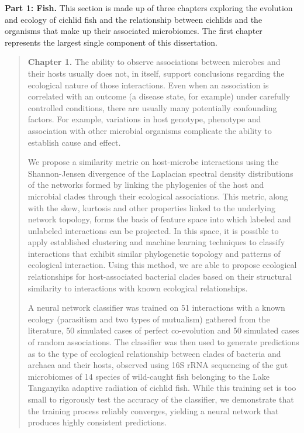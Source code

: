 
\noindent\textbf{Part 1: Fish.} 
This section is made up of three chapters exploring the evolution and ecology of cichlid fish and the relationship between cichlids and the organisms that make up their associated microbiomes. The first chapter represents the largest single component of this dissertation. 

\begin{quote}
\noindent\textbf{Chapter 1.} The ability to observe associations between microbes and their hosts usually does not, in itself, support conclusions regarding the ecological nature of those interactions. Even when an association is correlated with an outcome (a disease state, for example) under carefully controlled conditions, there are usually many potentially confounding factors. For example, variations in host genotype, phenotype and association with other microbial organisms complicate the ability to establish cause and effect.

We propose a similarity metric on host-microbe interactions using the Shannon-Jensen divergence of the Laplacian spectral density distributions of the networks formed by linking the phylogenies of the host and microbial clades through their ecological associations. This metric, along with the skew, kurtosis and other properties linked to the underlying network topology, forms the basis of feature space into which labeled and unlabeled interactions can be projected. In this space, it is possible to apply established clustering and machine learning techniques to classify interactions that exhibit similar phylogenetic topology and patterns of ecological interaction. Using this method, we are able to propose ecological relationships for host-associated bacterial clades based on their structural similarity to interactions with known ecological relationships.

A neural network classifier was trained on 51 interactions with a known ecology (parasitism and two types of mutualism) gathered from the literature, 50 simulated cases of perfect co-evolution and 50 simulated cases of random associations. The classifier was then used to generate predictions as to the type of ecological relationship between clades of bacteria and archaea and their hosts, observed using 16S rRNA sequencing of the gut microbiomes of 14 species of wild-caught fish belonging to the Lake Tanganyika adaptive radiation of cichlid fish. While this training set is too small to rigorously test the accuracy of the classifier, we demonstrate that the training process reliably converges, yielding a neural network that produces highly consistent predictions.
\end{quote}

